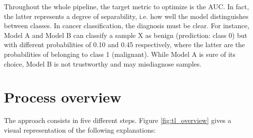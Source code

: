 Throughout the whole pipeline, the target metric to optimize is the AUC. In fact, the latter represents a degree of separability, i.e. how well the model distinguishes between classes. In cancer classification, the diagnosis must be clear. For instance, Model A and Model B can classify a sample X as benign (prediction: class 0) but with different probabilities of 0.10 and 0.45 respectively, where the latter are the probabilities of belonging to class 1 (malignant). While Model A is sure of its choice, Model B is not trustworthy and may misdiagnose samples. 


\section{Process overview}
\label{sec:process_overview}
\setlength{\marginparwidth}{3cm}\leavevmode {}The approach consists in five different steps. Figure \ref{fig:tl_overview} gives a visual representation of the following explanations:\\
